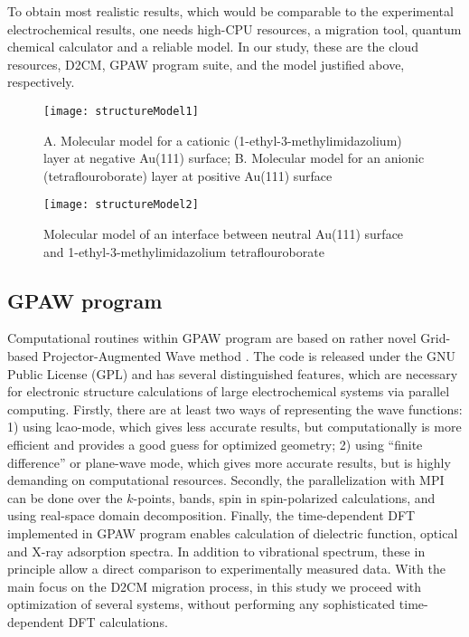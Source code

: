 \documentclass[a4paper,10pt]{article}
\begin{document}
To obtain most realistic results, which would be comparable to the experimental electrochemical results, one needs high-CPU resources, a migration tool, quantum chemical calculator and a reliable model. In our study, these are the cloud resources, D2CM, GPAW program suite, and the model justified above, respectively.

\begin{figure}
\centering
\texttt{[image: structureModel1]}
\caption{A. Molecular model for a cationic (1-ethyl-3-methylimidazolium) layer at negative Au(111) surface; B. Molecular model for an anionic (tetraflouroborate) layer at positive Au(111) surface}
\label{fig:structureModel1}
\end{figure}

\begin{figure}
\centering
\texttt{[image: structureModel2]}
\caption{Molecular model of an interface between neutral Au(111) surface and 1-ethyl-3-methylimidazolium tetraflouroborate}
\label{fig:structureModel2}
\end{figure}

\subsection{GPAW program}
Computational routines within GPAW program are based on rather novel Grid-based Projector-Augmented Wave method \cite{GPAW,GPAW2}. The code is released under the GNU Public License (GPL) and has several distinguished features, which are necessary for electronic structure calculations of large electrochemical systems via parallel computing. 
Firstly, there are at least two ways of representing the wave functions: 1) using lcao-mode, which gives less accurate results, but computationally is more efficient and provides a good guess for optimized geometry; 2) using ``finite difference'' or plane-wave mode, which gives more accurate results, but is highly demanding on computational resources.
Secondly, the parallelization with MPI can be done over the $k$-points, bands, spin in spin-polarized calculations, and using real-space domain decomposition. 
Finally, the time-dependent DFT implemented in GPAW program enables calculation of dielectric function, optical and X-ray adsorption spectra. In addition to vibrational spectrum, these in principle allow a direct comparison to experimentally measured data. With the main focus on the D2CM migration process, in this study we proceed with optimization of several systems, without performing any sophisticated time-dependent DFT calculations. 
\end{document}
